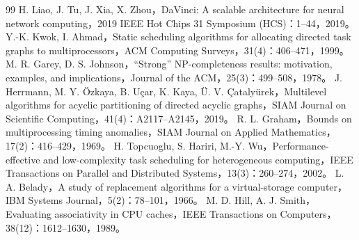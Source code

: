 \begin{thebibliography}{99}
 H. Liao, J. Tu, J. Xia, X. Zhou，DaVinci: A scalable architecture for neural network computing，2019 IEEE Hot Chips 31 Symposium (HCS)：1--44，2019。
 Y.-K. Kwok, I. Ahmad，Static scheduling algorithms for allocating directed task graphs to multiprocessors，ACM Computing Surveys，31(4)：406--471，1999。
 M. R. Garey, D. S. Johnson，``Strong'' NP-completeness results: motivation, examples, and implications，Journal of the ACM，25(3)：499--508，1978。
 J. Herrmann, M. Y. Özkaya, B. Uçar, K. Kaya, Ü. V. Çatalyürek，Multilevel algorithms for acyclic partitioning of directed acyclic graphs，SIAM Journal on Scientific Computing，41(4)：A2117--A2145，2019。
 R. L. Graham，Bounds on multiprocessing timing anomalies，SIAM Journal on Applied Mathematics，17(2)：416--429，1969。
 H. Topcuoglu, S. Hariri, M.-Y. Wu，Performance-effective and low-complexity task scheduling for heterogeneous computing，IEEE Transactions on Parallel and Distributed Systems，13(3)：260--274，2002。
 L. A. Belady，A study of replacement algorithms for a virtual-storage computer，IBM Systems Journal，5(2)：78--101，1966。
 M. D. Hill, A. J. Smith，Evaluating associativity in CPU caches，IEEE Transactions on Computers，38(12)：1612--1630，1989。
\end{thebibliography}

